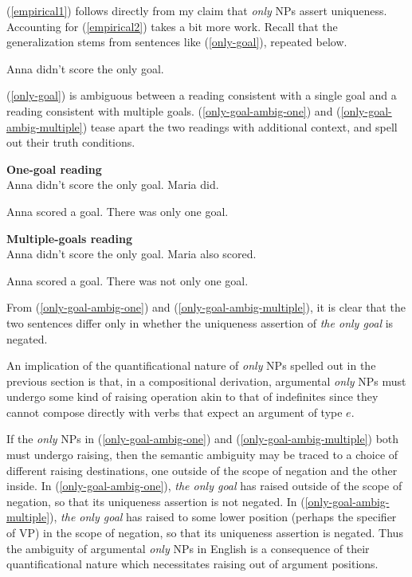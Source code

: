 (\ref{empirical1}) follows directly from my claim that \textit{only} NPs assert uniqueness. Accounting for (\ref{empirical2}) takes a bit more work. Recall that the generalization stems from sentences like (\ref{only-goal}), repeated below.

\begin{exe}
	 Anna didn't score the only goal.
\end{exe}

(\ref{only-goal}) is ambiguous between a reading consistent with a single goal and a reading consistent with multiple goals. (\ref{only-goal-ambig-one}) and (\ref{only-goal-ambig-multiple}) tease apart the two readings with additional context, and spell out their truth conditions.

\begin{exe}
	\ex \label{only-goal-ambig-one} \textbf{One-goal reading} \\ Anna didn't score the only goal. Maria did.
	\begin{xlist}
		\ex Anna scored a goal.
		\ex There was only one goal.
	\end{xlist}

	\ex \label{only-goal-ambig-multiple} \textbf{Multiple-goals reading} \\ Anna didn't score the only goal. Maria also scored.
	\begin{xlist}
		\ex Anna scored a goal.
		\ex There was not only one goal.
	\end{xlist}
\end{exe}

From (\ref{only-goal-ambig-one}) and (\ref{only-goal-ambig-multiple}), it is clear that the two sentences differ only in whether the uniqueness assertion of \textit{the only goal} is negated.

An implication of the quantificational nature of \textit{only} NPs spelled out in the previous section is that, in a compositional derivation, argumental \textit{only} NPs must undergo some kind of raising operation akin to that of indefinites since they cannot compose directly with verbs that expect an argument of type $e$.

If the \textit{only} NPs in (\ref{only-goal-ambig-one}) and (\ref{only-goal-ambig-multiple}) both must undergo raising, then the semantic ambiguity may be traced to a choice of different raising destinations, one outside of the scope of negation and the other inside. In (\ref{only-goal-ambig-one}), \textit{the only goal} has raised outside of the scope of negation, so that its uniqueness assertion is not negated. In (\ref{only-goal-ambig-multiple}), \textit{the only goal} has raised to some lower position (perhaps the specifier of VP) in the scope of negation, so that its uniqueness assertion is negated. Thus the ambiguity of argumental \textit{only} NPs in English is a consequence of their quantificational nature which necessitates raising out of argument positions.

